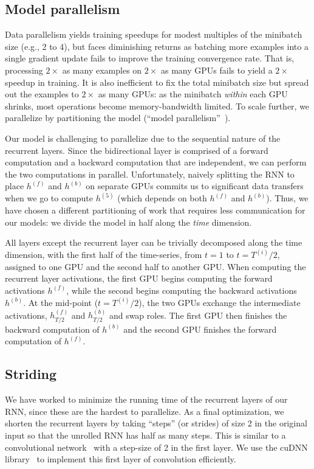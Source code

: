 \subsection{Model parallelism}

Data parallelism yields training speedups for modest multiples of the minibatch
size (e.g., 2 to 4), but faces diminishing returns as batching more examples
into a single gradient update fails to improve the training convergence rate.
That is, processing $2\times$ as many examples on $2\times$ as many GPUs fails
to yield a $2\times$ speedup in training. It is also inefficient to fix the
total minibatch size but spread out the examples to $2\times$ as many GPUs:  as
the minibatch \emph{within} each GPU shrinks, most operations become
memory-bandwidth limited. To scale further, we parallelize by partitioning the
model (``model parallelism''~\cite{coates2013cotshpc, dean2012}).

Our model is challenging to parallelize due to the sequential nature of the
recurrent layers. Since the bidirectional layer is comprised of a forward
computation and a backward computation that are independent, we can perform the
two computations in parallel. Unfortunately, naively splitting the RNN to place
$h^{(f)}$ and $h^{(b)}$ on separate GPUs commits us to significant data
transfers when we go to compute $h^{(5)}$ (which depends on both $h^{(f)}$ and
$h^{(b)}$). Thus, we have chosen a different partitioning of work that requires
less communication for our models: we divide the model in half along the
\emph{time} dimension.

All layers except the recurrent layer can be trivially decomposed along the
time dimension, with the first half of the time-series, from $t=1$ to
$t=T^{(i)}/2$, assigned to one GPU and the second half to another GPU. When
computing the recurrent layer activations, the first GPU begins computing the
forward activations $h^{(f)}$, while the second begins computing the backward
activations $h^{(b)}$. At the mid-point ($t=T^{(i)}/2$), the two GPUs exchange
the intermediate activations, $h^{(f)}_{T/2}$ and $h^{(b)}_{T/2}$ and swap
roles. The first GPU then finishes the backward computation of $h^{(b)}$ and
the second GPU finishes the forward computation of $h^{(f)}$.

\subsection{Striding}

We have worked to minimize the running time of the recurrent layers of our RNN,
since these are the hardest to parallelize. As a final optimization, we
shorten the recurrent layers by taking ``steps'' (or strides) of size 2 in the
original input so that the unrolled RNN has half as many steps. This is
similar to a convolutional network~\cite{lecun1989} with a step-size of 2 in
the first layer. We use the cuDNN library~\cite{chetlur2014cudnn} to implement
this first layer of convolution efficiently.
